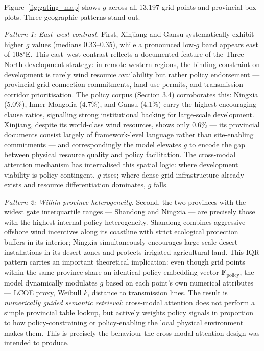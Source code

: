 \documentclass[12pt, a4paper]{article}
\begin{document}
Figure~\ref{fig:gating_map} shows $g$ across all 13,197 grid
points and provincial box plots. Three geographic patterns
stand out.

\textit{Pattern 1: East--west contrast.}
First, Xinjiang and Gansu systematically exhibit
higher $g$ values (medians 0.33--0.35), while a pronounced
low-$g$ band appears east of 108$^\circ$E. This east--west
contrast reflects a documented feature of the Three-North
development strategy: in remote western regions, the binding
constraint on development is rarely wind resource availability
but rather policy endorsement --- provincial grid-connection
commitments, land-use permits, and transmission corridor
prioritisation. The policy corpus (Section 3.4) corroborates
this: Ningxia (5.0\%), Inner Mongolia (4.7\%), and Gansu
(4.1\%) carry the highest encouraging-clause ratios, signalling
strong institutional backing for large-scale development.
Xinjiang, despite its world-class wind resources, shows only
0.6\% --- its provincial documents consist largely of
framework-level language rather than site-enabling commitments
--- and correspondingly the model elevates $g$ to encode the
gap between physical resource quality and policy facilitation.
The cross-modal attention mechanism has internalised this
spatial logic: where development viability is policy-contingent,
$g$ rises; where dense grid infrastructure already exists and
resource differentiation dominates, $g$ falls.

\textit{Pattern 2: Within-province heterogeneity.}
Second, the two provinces with the widest gate
interquartile ranges --- Shandong and Ningxia --- are
precisely those with the highest internal policy
heterogeneity. Shandong combines aggressive offshore wind
incentives along its coastline with strict ecological
protection buffers in its interior; Ningxia simultaneously
encourages large-scale desert installations in its desert
zones and protects irrigated agricultural land. This IQR
pattern carries an important theoretical implication: even
though grid points within the same province share an identical
policy embedding vector $\mathbf{F}_\text{policy}$, the model
dynamically modulates $g$ based on each point's own numerical
attributes --- LCOE proxy, Weibull $k$, distance to
transmission lines. The result is \textit{numerically guided
semantic retrieval}: cross-modal attention does not perform a
simple provincial table lookup, but actively weights policy
signals in proportion to how policy-constraining or
policy-enabling the local physical environment makes them.
This is precisely the behaviour the cross-modal attention
design was intended to produce.
\end{document}
